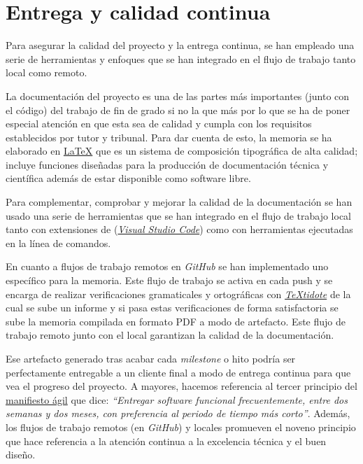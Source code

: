 \section{Entrega y calidad continua}

Para asegurar la calidad del proyecto y la entrega continua, se han empleado una serie de herramientas y enfoques que se han integrado en el flujo de trabajo tanto local como remoto.

La documentación del proyecto es una de las partes más importantes (junto con el código) del trabajo de fin de grado si no la que más por lo que se ha de poner especial atención en que esta sea de calidad y cumpla con los requisitos establecidos por tutor y tribunal. Para dar cuenta de esto, la memoria se ha elaborado en \href{https://www.latex-project.org/}{\LaTeX{}} que es un sistema de composición tipográfica de alta calidad; incluye funciones diseñadas para la producción de documentación técnica y científica además de estar disponible como software libre.

Para complementar, comprobar y mejorar la calidad de la documentación se han usado una serie de herramientas que se han integrado en el flujo de trabajo local tanto con extensiones de (\href{https://code.visualstudio.com/}{\textit{Visual Studio Code}}) como con herramientas ejecutadas en la línea de comandos.

En cuanto a flujos de trabajo remotos en \textit{GitHub} se han implementado uno específico para la memoria. Este flujo de trabajo se activa en cada push y se encarga de realizar verificaciones gramaticales y ortográficas con \href{https://github.com/sylvainhalle/textidote}{\textit{TeXtidote}} de la cual se sube un informe y si pasa estas verificaciones de forma satisfactoria se sube la memoria compilada en formato PDF a modo de artefacto. Este flujo de trabajo remoto junto con el local garantizan la calidad de la documentación.

Ese artefacto generado tras acabar cada \textit{milestone} o hito podría ser perfectamente entregable a un cliente final a modo de entrega continua para que vea el progreso del proyecto. A mayores, hacemos referencia al tercer principio del \href{https://agilemanifesto.org/iso/es/principles.html}{manifiesto ágil} que dice: \textit{``Entregar software funcional frecuentemente, entre dos semanas y dos meses, con preferencia al periodo de tiempo más corto''}. Además, los flujos de trabajo remotos (en \textit{GitHub}) y locales promueven el noveno principio que hace referencia a la atención continua a la excelencia técnica y el buen diseño.

